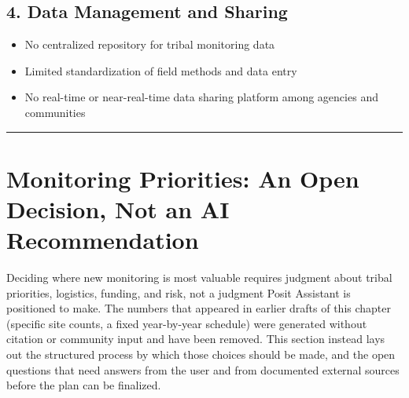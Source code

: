 \documentclass[
  letterpaper,
]{scrbook}
\providecommand{\tightlist}{%
  \setlength{\itemsep}{0pt}\setlength{\parskip}{0pt}}\usepackage{longtable,booktabs,array}
\begin{document}
\subsection{4. Data Management and
Sharing}\label{data-management-and-sharing}

\begin{itemize}
\tightlist
\item
  No centralized repository for tribal monitoring data
\item
  Limited standardization of field methods and data entry
\item
  No real-time or near-real-time data sharing platform among agencies
  and communities
\end{itemize}

\begin{center}\rule{0.5\linewidth}{0.5pt}\end{center}

\section{Monitoring Priorities: An Open Decision, Not an AI
Recommendation}\label{monitoring-priorities-an-open-decision-not-an-ai-recommendation}

\begin{tcolorbox}[enhanced jigsaw, rightrule=.15mm, breakable, titlerule=0mm, title=\textcolor{quarto-callout-important-color}{\faExclamation}\hspace{0.5em}{This section intentionally does not prescribe site counts, parameters,
or timelines}, coltitle=black, leftrule=.75mm, bottomrule=.15mm, left=2mm, toptitle=1mm, colframe=quarto-callout-important-color-frame, toprule=.15mm, arc=.35mm, colback=white, opacityback=0, colbacktitle=quarto-callout-important-color!10!white, opacitybacktitle=0.6, bottomtitle=1mm]

Deciding where new monitoring is most valuable requires judgment about
tribal priorities, logistics, funding, and risk, not a judgment Posit
Assistant is positioned to make. The numbers that appeared in earlier
drafts of this chapter (specific site counts, a fixed year-by-year
schedule) were generated without citation or community input and have
been removed. This section instead lays out the structured process by
which those choices should be made, and the open questions that need
answers from the user and from documented external sources before the
plan can be finalized.

\end{tcolorbox}
\end{document}
